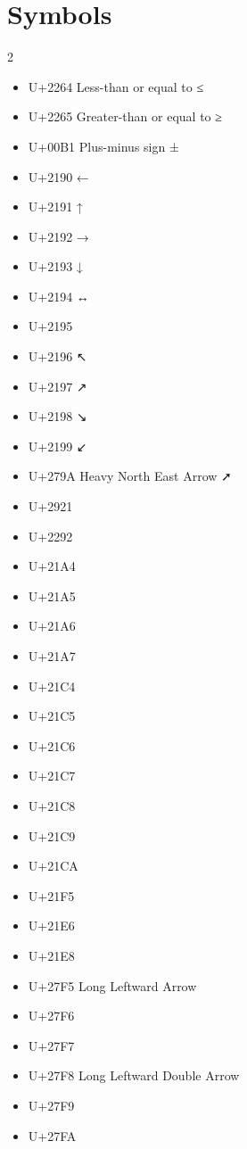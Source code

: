 \chapter{Symbols}


\begin{multicols}{2}
\begin{itemize}
    \item U+2264 Less-than or equal to ≤
    \item U+2265 Greater-than or equal to ≥
    \item U+00B1 Plus-minus sign ±
    \item U+2190 ←
    \item U+2191 ↑
    \item U+2192 →
    \item U+2193 ↓
    \item U+2194 ↔
    \item U+2195 %
    \item U+2196 ↖
    \item U+2197 ↗
    \item U+2198 ↘
    \item U+2199 ↙
    \item U+279A Heavy North East Arrow ➚
    \item U+2921 %
    \item U+2292 %
    \item U+21A4 %
    \item U+21A5 %
    \item U+21A6 %
    \item U+21A7 %
    \item U+21C4 %
    \item U+21C5 %
    \item U+21C6 %
    \item U+21C7 %
    \item U+21C8 %
    \item U+21C9 %
    \item U+21CA %
    \item U+21F5 %
    \item U+21E6 %
    \item U+21E8 %
    \item U+27F5 Long Leftward Arrow %
    \item U+27F6 %
    \item U+27F7 %
    \item U+27F8 Long Leftward Double Arrow %
    \item U+27F9 %
    \item U+27FA %

\end{itemize}
\end{multicols}
